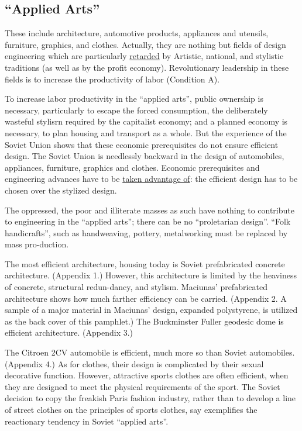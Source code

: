 \subsection*{\enquote{Applied Arts}}
These include architecture, automotive products, appliances and
utensils, furniture, graphics, and clothes. Actually, they are nothing
but fields of design engineering which are particularly \uline{retarded} 
by Artistic, national, and stylistic traditions (as well as by the profit
economy). Revolutionary leadership in these fields is to increase the
productivity of labor (Condition A). 

To increase labor productivity in the \enquote{applied arts}, public
ownership is necessary, particularly to escape the forced consumption,
the deliberately wasteful stylisrn required by the capitalist economy;
and a planned economy is necessary, to plan housing and transport as a
whole. But the experience of the Soviet Union shows that these economic
prerequisites do not ensure efficient design. The Soviet Union is 
needlessly backward in the design of automobiles, appliances, furniture,
graphics and clothes. Economic prerequisites and engineering advances
have to be \uline{taken advantage of}: the efficient design has to be chosen 
over the stylized design. 

The oppressed, the poor and illiterate masses as such have nothing to 
contribute to engineering in the \enquote{applied arts}; there can be no 
\enquote{proletarian design}. \enquote{Folk handicrafts}, such as handweaving, pottery,
metalworking must be replaced by mass pro-duction. 

The most efficient architecture, housing today is Soviet prefabricated
concrete architecture. (Appendix 1.) However, this architecture is 
limited by the heaviness of concrete, structural redun-dancy, and 
stylism. Maciunas' prefabricated architecture shows how much farther 
efficiency can be carried. (Appendix 2. A sample of a major material 
in Maciunas' design, expanded polystyrene, is utilized as the back 
cover of this pamphlet.) The Buckminster Fuller geodesic dome is efficient
architecture. (Appendix 3.) 

The Citroen 2CV automobile is efficient, much more so than Soviet 
automobiles. (Appendix 4.) As for clothes, their design is complicated by
their sexual decorative function. However, attractive sports clothes are
often efficient, when they are designed to meet the physical requirements of
the sport. The Soviet decision to copy the freakish Paris fashion industry,
rather than to develop a line of street clothes on the principles of sports
clothes, say exemplifies the reactionary tendency in Soviet \enquote{applied arts}. 


